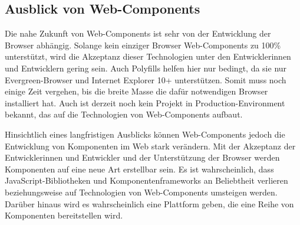 \subsection{Ausblick von Web-Components}
\label{sec:5_Ausblick}

Die nahe Zukunft von Web-Components ist sehr von der Entwicklung der Browser abhängig. Solange kein einziger Browser Web-Components zu 100\% unterstützt, wird die Akzeptanz dieser Technologien unter den Entwicklerinnen und Entwicklern gering sein. Auch Polyfills helfen hier nur bedingt, da sie nur \glqq Evergreen\grqq -Browser und Internet Explorer 10+ unterstützen. Somit muss noch einige Zeit vergehen, bis die breite Masse die dafür notwendigen Browser installiert hat. Auch ist derzeit noch kein Projekt in Production-Environment bekannt, das auf die Technologien von Web-Components aufbaut.

Hinsichtlich eines langfristigen Ausblicks können Web-Components jedoch die Entwicklung von Komponenten im Web stark verändern. Mit der Akzeptanz der Entwicklerinnen und Entwickler und der Unterstützung der Browser werden Komponenten auf eine neue Art erstellbar sein. Es ist wahrscheinlich, dass JavaScript-Bibliotheken und Komponentenframeworks an Beliebtheit verlieren beziehungsweise auf Technologien von Web-Components umsteigen werden. Darüber hinaus wird es wahrscheinlich eine Plattform geben, die eine Reihe von Komponenten bereitstellen wird.